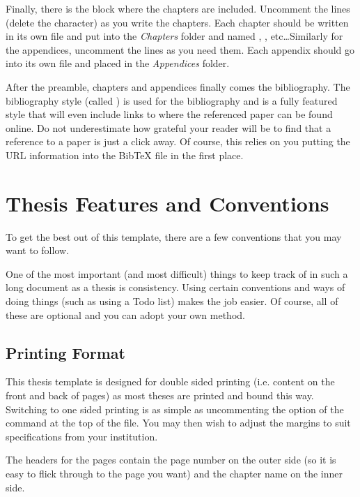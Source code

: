 Finally, there is the block where the chapters are included. Uncomment the lines (delete the \code{\%} character) as you write the chapters. Each chapter should be written in its own file and put into the \emph{Chapters} folder and named , , etc\ldots Similarly for the appendices, uncomment the lines as you need them. Each appendix should go into its own file and placed in the \emph{Appendices} folder.

After the preamble, chapters and appendices finally comes the bibliography. The bibliography style (called ) is used for the bibliography and is a fully featured style that will even include links to where the referenced paper can be found online. Do not underestimate how grateful your reader will be to find that a reference to a paper is just a click away. Of course, this relies on you putting the URL information into the BibTeX file in the first place.


\section{Thesis Features and Conventions}\label{ThesisConventions}

To get the best out of this template, there are a few conventions that you may want to follow.

One of the most important (and most difficult) things to keep track of in such a long document as a thesis is consistency. Using certain conventions and ways of doing things (such as using a Todo list) makes the job easier. Of course, all of these are optional and you can adopt your own method.

\subsection{Printing Format}

This thesis template is designed for double sided printing (i.e. content on the front and back of pages) as most theses are printed and bound this way. Switching to one sided printing is as simple as uncommenting the  option of the  command at the top of the  file. You may then wish to adjust the margins to suit specifications from your institution.

The headers for the pages contain the page number on the outer side (so it is easy to flick through to the page you want) and the chapter name on the inner side.

